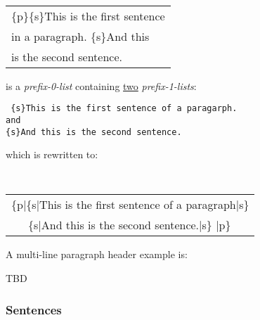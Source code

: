 \documentclass[12pt]{article}
\newenvironment{indpar}[1][0.3in]%
	{\begin{list}{}%
		     {\setlength{\itemsep}{0in}%
		      \setlength{\topsep}{0in}%
		      \setlength{\parsep}{1ex}%
		      \setlength{\labelwidth}{#1}%
		      \setlength{\leftmargin}{#1}%
		      \addtolength{\leftmargin}{\labelsep}}%
	 \item}%
	{\end{list}}
\begin{document}
\begin{indpar}
\tt
\begin{tabular}{l}
\{p\}\{s\}This is the first sentence \\
in a paragraph.  \{s\}And this \\
is the second sentence. \\
\end{tabular}
\end{indpar}
is a {\em prefix-0-list} containing \underline{two} {\em prefix-1-lists}:
\begin{indpar}
\tt
\{s\}This is the first sentence of a paragarph. \\
{\rm and} \\
\{s\}And this is the second sentence.
\end{indpar}
which is rewritten to:
\begin{indpar}
\tt
\begin{tabular}{l}
\{p|\{s|This is the first sentence of a paragraph|s\} \\
~~~\{s|And this is the second sentence.|s\} |p\}
\end{tabular}
\end{indpar}


A multi-line paragraph header example is:

TBD


\subsubsection{Sentences}
\label{SENTENCES}
\end{document}
